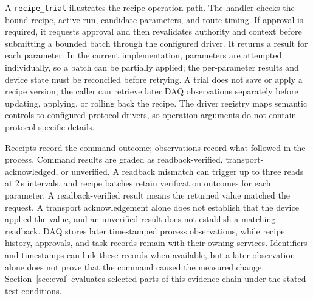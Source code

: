 A \texttt{recipe\_trial} illustrates the recipe-operation path. The handler
checks the bound recipe, active run, candidate parameters, and route timing.
If approval is required, it requests approval and then revalidates authority
and context before submitting a bounded batch through the configured driver.
It returns a result for each parameter. In the current implementation,
parameters are attempted individually, so a batch can be partially applied;
the per-parameter results and device state must be reconciled before retrying.
A trial does not save or apply a recipe version; the caller can retrieve later DAQ observations separately
before updating, applying, or rolling back the recipe. The driver registry
maps semantic controls to configured protocol drivers, so operation arguments
do not contain protocol-specific details.

Receipts record the command outcome; observations record what followed in
the process. Command results are graded as readback-verified,
transport-acknowledged, or unverified. A readback mismatch can trigger up to
three reads at 2\,s intervals, and recipe batches retain verification
outcomes for each parameter. A readback-verified result means the returned
value matched the request. A transport acknowledgement alone does not
establish that the device applied the value, and an unverified result does
not establish a matching readback. DAQ stores later timestamped process
observations, while recipe history, approvals, and task records remain with
their owning services. Identifiers and timestamps can link these records
when available, but a later observation alone does not prove that the command
caused the measured change. Section~\ref{sec:eval} evaluates selected parts
of this evidence chain under the stated test conditions.

